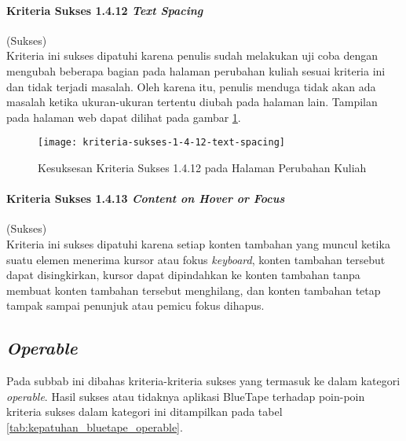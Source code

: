 \paragraph{Kriteria Sukses 1.4.12 \textit{Text Spacing}}
\label{par:kepatuhan_bluetape_kriteria_sukses_1.4.12}
(Sukses)\\

Kriteria ini sukses dipatuhi karena penulis sudah melakukan uji coba dengan mengubah beberapa bagian pada halaman perubahan kuliah sesuai kriteria ini dan tidak terjadi masalah. Oleh karena itu, penulis menduga tidak akan ada masalah ketika ukuran-ukuran tertentu diubah pada halaman lain. Tampilan pada halaman web dapat dilihat pada gambar \ref{fig:1.4.12_text_spacing}.

\begin{figure}[H]
    \centering  
    \texttt{[image: kriteria-sukses-1-4-12-text-spacing]}  
    \caption[Kesuksesan Kriteria Sukses 1.4.12 pada Halaman Perubahan Kuliah]{Kesuksesan Kriteria Sukses 1.4.12 pada Halaman Perubahan Kuliah}
    \label{fig:1.4.12_text_spacing}  
\end{figure} 

\paragraph{Kriteria Sukses 1.4.13 \textit{Content on Hover or Focus}}
\label{par:kepatuhan_bluetape_kriteria_sukses_1.4.13}
(Sukses)\\

Kriteria ini sukses dipatuhi karena setiap konten tambahan yang muncul ketika suatu elemen menerima kursor atau fokus \textit{keyboard}, konten tambahan tersebut dapat disingkirkan, kursor dapat dipindahkan ke konten tambahan tanpa membuat konten tambahan tersebut menghilang, dan konten tambahan tetap tampak sampai penunjuk atau pemicu fokus dihapus.

\subsection{\textit{Operable}}
\label{subsec:kepatuhan_bluetape_operable}
Pada subbab ini dibahas kriteria-kriteria sukses yang termasuk ke dalam kategori \textit{operable}. Hasil sukses atau tidaknya aplikasi BlueTape terhadap poin-poin kriteria sukses dalam kategori ini ditampilkan pada tabel \ref{tab:kepatuhan_bluetape_operable}.


